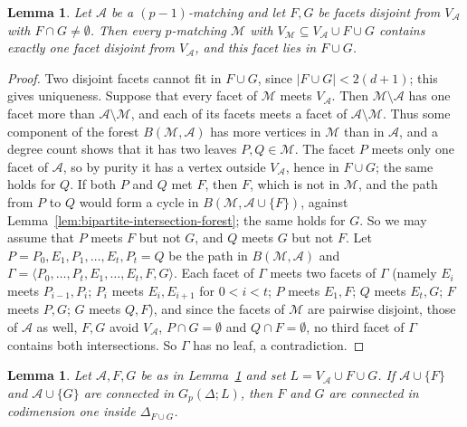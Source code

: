 \documentclass{amsart}
\newtheorem{Lemma}[Theorem]{Lemma}
\theoremstyle{definition}
\theoremstyle{remark}
\begin{document}


\begin{Lemma}\label{lem:unique-facet-overlap}
Let $\mathcal A$ be a $(p-1)$-matching and let $F,G$ be facets disjoint from $V_{\mathcal A}$ with $F\cap G\neq\emptyset$. Then every $p$-matching $\mathcal M$ with $V_{\mathcal M}\subseteq V_{\mathcal A}\cup F\cup G$ contains exactly one facet disjoint from $V_{\mathcal A}$, and this facet lies in $F\cup G$.
\end{Lemma}

\begin{proof}
Two disjoint facets cannot fit in $F\cup G$, since $|F\cup G|<2(d+1)$; this gives uniqueness. Suppose that every facet of $\mathcal M$ meets $V_{\mathcal A}$. Then $\mathcal M\setminus\mathcal A$ has one facet more than $\mathcal A\setminus\mathcal M$, and each of its facets meets a facet of $\mathcal A\setminus\mathcal M$. Thus some component of the forest $B(\mathcal M,\mathcal A)$ has more vertices in $\mathcal M$ than in $\mathcal A$, and a degree count shows that it has two leaves $P,Q\in\mathcal M$. The facet $P$ meets only one facet of $\mathcal A$, so by purity it has a vertex outside $V_{\mathcal A}$, hence in $F\cup G$; the same holds for $Q$. If both $P$ and $Q$ met $F$, then $F$, which is not in $\mathcal M$, and the path from $P$ to $Q$ would form a cycle in $B(\mathcal M,\mathcal A\cup\{F\})$, against Lemma~\ref{lem:bipartite-intersection-forest}; the same holds for $G$. So we may assume that $P$ meets $F$ but not $G$, and $Q$ meets $G$ but not $F$. Let $P=P_0,E_1,P_1,\ldots,E_t,P_t=Q$ be the path in $B(\mathcal M,\mathcal A)$ and $\Gamma=\langle P_0,\ldots,P_t,E_1,\ldots,E_t,F,G\rangle$. Each facet of $\Gamma$ meets two facets of $\Gamma$ (namely $E_i$ meets $P_{i-1},P_i$; $P_i$ meets $E_i,E_{i+1}$ for $0<i<t$; $P$ meets $E_1,F$; $Q$ meets $E_t,G$; $F$ meets $P,G$; $G$ meets $Q,F$), and since the facets of $\mathcal M$ are pairwise disjoint, those of $\mathcal A$ as well, $F,G$ avoid $V_{\mathcal A}$, $P\cap G=\emptyset$ and $Q\cap F=\emptyset$, no third facet of $\Gamma$ contains both intersections. So $\Gamma$ has no leaf, a contradiction.
\end{proof}



\begin{Lemma}\label{lem:path-gives-codim-one}
Let $\mathcal A,F,G$ be as in Lemma~\ref{lem:unique-facet-overlap} and set $L=V_{\mathcal A}\cup F\cup G$. If $\mathcal A\cup\{F\}$ and $\mathcal A\cup\{G\}$ are connected in $G_p(\Delta;L)$, then $F$ and $G$ are connected in codimension one inside $\Delta_{F\cup G}$.
\end{Lemma}
\end{document}
